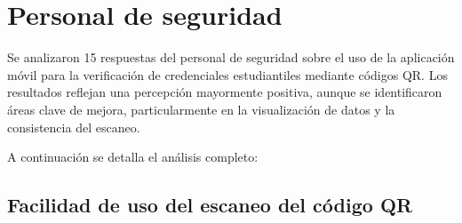 
\section{Personal de seguridad}

Se analizaron 15 respuestas del personal de seguridad sobre el uso de la aplicación móvil para la verificación de credenciales estudiantiles mediante códigos QR. Los resultados reflejan una percepción mayormente positiva, aunque se identificaron áreas clave de mejora, particularmente en la visualización de datos y la consistencia del escaneo.

A continuación se detalla el análisis completo:

\subsection{Facilidad de uso del escaneo del código QR}

